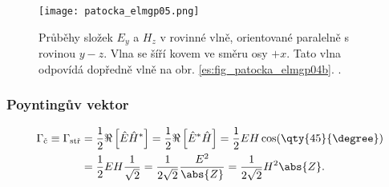           \begin{figure}[ht!]
            \centering
            \texttt{[image: patocka\_elmgp05.png]}
            \caption{Průběhy složek \(E_y\) a \(H_z\) v rovinné vlně, orientované paralelně s 
                     rovinou \(y-z\). Vlna se šíří kovem ve směru osy \(+x\). Tato vlna odpovídá 
                     dopředně vlně na obr. \ref{es:fig_patocka_elmgp04b}. \cite[s.~80]{Patocka4}.}
            \label{ES:fig_elmgp05}
          \end{figure}
                
        \subsubsection{Poyntingův vektor}
          \begin{align}\
            \Gamma_\text{č} \equiv \Gamma_\text{stř} 
              &= \frac{1}{2}\Re\left[\hat{E}\hat{H}^*\right] 
               = \frac{1}{2}\Re\left[\hat{E}^*\hat{H}\right]     
               = \frac{1}{2}EH\cos(\qty{45}{\degree})                 \nonumber \\ 
              &= \frac{1}{2}EH\frac{1}{\sqrt{2}}
               = \frac{1}{2\sqrt{2}}\frac{E^2}{\abs{Z}}
               = \frac{1}{2\sqrt{2}}H^2\abs{Z}.                      \label{ES:eq_elmagp52}
          \end{align}
